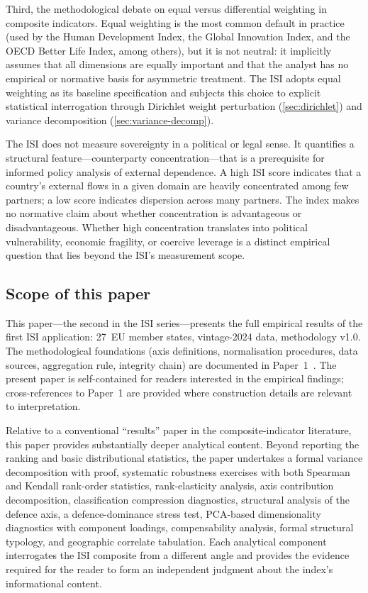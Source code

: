 Third, the methodological debate on equal versus differential
weighting in composite indicators.  Equal weighting is the most
common default in practice (used by the Human Development Index,
the Global Innovation Index, and the OECD Better Life Index, among
others), but it is not neutral: it implicitly assumes that all
dimensions are equally important and that the analyst has no
empirical or normative basis for asymmetric treatment.  The ISI
adopts equal weighting as its baseline specification and subjects
this choice to explicit statistical interrogation through Dirichlet
weight perturbation (\cref{sec:dirichlet}) and variance
decomposition (\cref{sec:variance-decomp}).

The ISI does not measure sovereignty in a political or legal sense.
It quantifies a structural feature---counterparty
concentration---that is a prerequisite for informed policy analysis of
external dependence.  A high ISI score indicates that a country's
external flows in a given domain are heavily concentrated among few
partners; a low score indicates dispersion across many partners.  The
index makes no normative claim about whether concentration is
advantageous or disadvantageous.  Whether high concentration
translates into political vulnerability, economic fragility, or
coercive leverage is a distinct empirical question that lies beyond
the ISI's measurement scope.

\subsection{Scope of this paper}

This paper---the second in the ISI series---presents the full
empirical results of the first ISI application: 27~EU member states,
vintage-2024 data, methodology v1.0.  The methodological foundations
(axis definitions, normalisation procedures, data sources, aggregation
rule, integrity chain) are documented in Paper~1~\cite{isi_paper1}.
The present paper is self-contained for readers interested in the
empirical findings; cross-references to Paper~1 are provided where
construction details are relevant to interpretation.

Relative to a conventional ``results'' paper in the composite-indicator
literature, this paper provides substantially deeper analytical content.
Beyond reporting the ranking and basic distributional statistics, the
paper undertakes a formal variance decomposition with proof, systematic
robustness exercises with both Spearman and Kendall rank-order
statistics, rank-elasticity analysis, axis contribution decomposition,
classification compression diagnostics, structural analysis of the
defence axis, a defence-dominance stress test, PCA-based dimensionality
diagnostics with component loadings, compensability analysis, formal
structural typology, and geographic correlate tabulation.  Each
analytical component interrogates the ISI composite from a different
angle and provides the evidence required for the reader to form an
independent judgment about the index's informational content.

